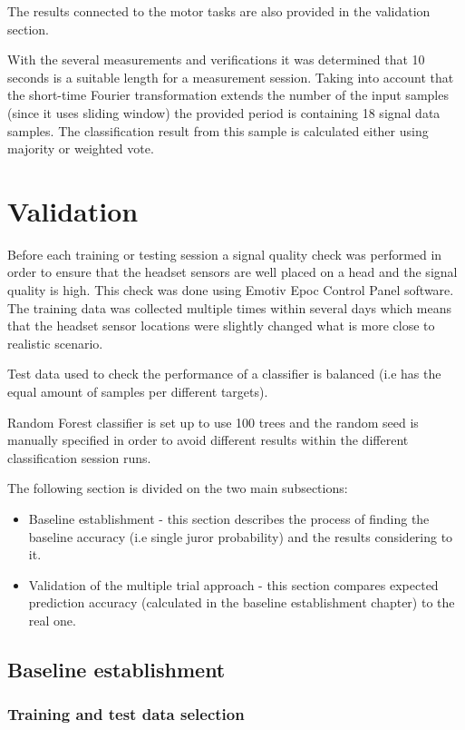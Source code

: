 \documentclass[12pt]{article}
\begin{document}
The results connected to the motor tasks are also provided in the validation section.

With the several measurements and verifications it was determined that 10 seconds is a suitable length for a measurement session. Taking into account that the short-time Fourier transformation extends the number of the input samples (since it uses sliding window) the provided period is containing 18 signal data samples. The classification result from this sample is calculated either using majority or weighted vote.
\newpage
\section{Validation}
Before each training or testing session a signal quality check was performed in order to ensure that the headset sensors are well placed on a head and the signal quality is high. This check was done using Emotiv Epoc Control Panel software. The training data was collected multiple times within several days which means that the headset sensor locations were slightly changed what is more close to realistic scenario. 

Test data used to check the performance of a classifier is balanced (i.e has the equal amount of samples per different targets).

Random Forest classifier is set up to use 100 trees and the random seed is manually specified in order to avoid different results within the different classification session runs.

The following section is divided on the two main subsections:
\begin{itemize}
\item Baseline establishment - this section describes the process of finding the baseline accuracy (i.e single juror probability) and the results considering to it. 
\item Validation of the multiple trial approach - this section compares expected prediction accuracy (calculated in the baseline establishment chapter) to the real one.
\end{itemize}
\subsection{Baseline establishment}

\subsubsection{Training and test data selection}
\end{document}
